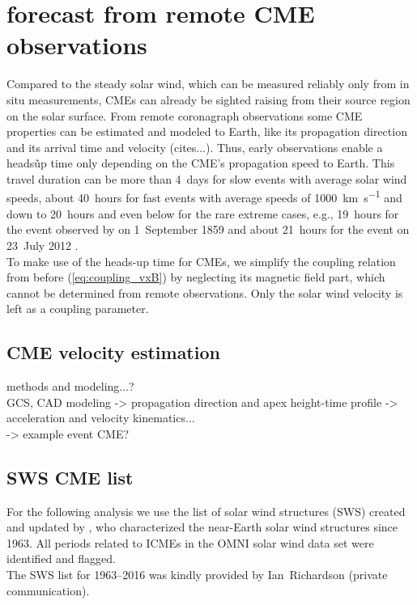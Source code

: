 \section{\Kp{} forecast from remote CME observations}
Compared to the steady solar wind, which can be measured reliably only from in situ measurements, CMEs can already be sighted raising from their source region on the solar surface. From remote coronagraph observations some CME properties can be estimated and modeled to Earth, like its propagation direction and its arrival time and velocity (cites...). Thus, early observations enable a heads\~up time only depending on the CME's propagation speed to Earth. This travel duration can be more than 4~days for slow events with average solar wind speeds, about 40~hours for fast events with average speeds of \SI{1000}{\km\per\s} and down to 20~hours and even below for the rare extreme cases, e.g., 19~hours for the event observed by \citet{Carrington1859} on 1~September 1859 and about 21~hours for the event on 23~July 2012 \citep{Russell2013,Temmer2015}.\\

To make use of the heads-up time for CMEs, we simplify the coupling relation from before (\ref{eq:coupling_vxB}) by neglecting its magnetic field part, which cannot be determined from remote observations. Only the solar wind velocity is left as a coupling parameter.\\

\subsection{CME velocity estimation}
methods and modeling...?\\
GCS, CAD modeling -> propagation direction and apex height-time profile -> acceleration and velocity kinematics...\\
-> example event CME?\\

\subsection{SWS CME list}
For the following analysis we use the list of solar wind structures (SWS) created and updated by \citet{Richardson2000,Richardson2012}, who characterized the near-Earth solar wind structures since 1963. All periods related to ICMEs in the OMNI solar wind data set were identified and flagged.\\

The SWS list for 1963--2016 was kindly provided by Ian~Richardson (private communication).\\

